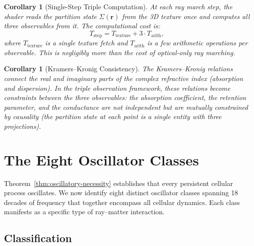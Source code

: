 \documentclass[11pt,twocolumn,a4paper]{article}
\newtheorem{corollary}[theorem]{Corollary}
\begin{document}
\begin{corollary}[Single-Step Triple Computation]
\label{cor:single-step}
At each ray march step, the shader reads the partition state
$\Sigma(\mathbf{r})$ from the 3D texture \emph{once} and computes all
three observables from it. The computational cost is:
\begin{equation}
T_{\mathrm{step}} = T_{\mathrm{texture}} + 3 \cdot T_{\mathrm{arith}},
\end{equation}
where $T_{\mathrm{texture}}$ is a single texture fetch and
$T_{\mathrm{arith}}$ is a few arithmetic operations per observable.
This is negligibly more than the cost of optical-only ray marching.
\end{corollary}

\begin{corollary}[Kramers--Kronig Consistency]
\label{cor:kramers-kronig}
The Kramers--Kronig relations \citep{kramerskronig1927} connect the
real and imaginary parts of the complex refractive index (absorption
and dispersion). In the triple observation framework, these relations
become constraints between the three observables: the absorption
coefficient, the retention parameter, and the conductance are not
independent but are mutually constrained by causality (the partition
state at each point is a single entity with three projections).
\end{corollary}



\section{The Eight Oscillator Classes}
\label{sec:oscillator-classes}

Theorem~\ref{thm:oscillatory-necessity} establishes that every
persistent cellular process oscillates. We now identify eight distinct
oscillator classes spanning 18 decades of frequency that together
encompass all cellular dynamics. Each class manifests as a specific
type of ray--matter interaction.

\subsection{Classification}
\end{document}
